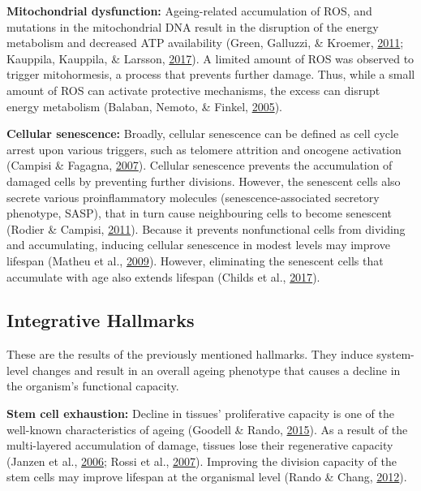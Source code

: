 \documentclass[12pt,twoside]{unicam}
\begin{document}
\textbf{Mitochondrial dysfunction:} Ageing-related accumulation of ROS, and mutations in the mitochondrial DNA result in the disruption of the energy metabolism and decreased ATP availability (Green, Galluzzi, \& Kroemer, \protect\hyperlink{ref-Green2011}{2011}; Kauppila, Kauppila, \& Larsson, \protect\hyperlink{ref-Kauppila2017}{2017}). A limited amount of ROS was observed to trigger mitohormesis, a process that prevents further damage. Thus, while a small amount of ROS can activate protective mechanisms, the excess can disrupt energy metabolism (Balaban, Nemoto, \& Finkel, \protect\hyperlink{ref-Balaban2005}{2005}).

\textbf{Cellular senescence:} Broadly, cellular senescence can be defined as cell cycle arrest upon various triggers, such as telomere attrition and oncogene activation (Campisi \& Fagagna, \protect\hyperlink{ref-Campisi2007}{2007}). Cellular senescence prevents the accumulation of damaged cells by preventing further divisions. However, the senescent cells also secrete various proinflammatory molecules (senescence-associated secretory phenotype, SASP), that in turn cause neighbouring cells to become senescent (Rodier \& Campisi, \protect\hyperlink{ref-Rodier2011}{2011}). Because it prevents nonfunctional cells from dividing and accumulating, inducing cellular senescence in modest levels may improve lifespan (Matheu et al., \protect\hyperlink{ref-Matheu2009}{2009}). However, eliminating the senescent cells that accumulate with age also extends lifespan (Childs et al., \protect\hyperlink{ref-Childs2017}{2017}).

\hypertarget{integrative-hallmarks}{%
\subsection{Integrative Hallmarks}\label{integrative-hallmarks}}

These are the results of the previously mentioned hallmarks. They induce system-level changes and result in an overall ageing phenotype that causes a decline in the organism's functional capacity.

\textbf{Stem cell exhaustion:} Decline in tissues' proliferative capacity is one of the well-known characteristics of ageing (Goodell \& Rando, \protect\hyperlink{ref-Goodell2015}{2015}). As a result of the multi-layered accumulation of damage, tissues lose their regenerative capacity (Janzen et al., \protect\hyperlink{ref-Janzen2006}{2006}; Rossi et al., \protect\hyperlink{ref-Rossi2007}{2007}). Improving the division capacity of the stem cells may improve lifespan at the organismal level (Rando \& Chang, \protect\hyperlink{ref-Rando2012}{2012}).
\end{document}
